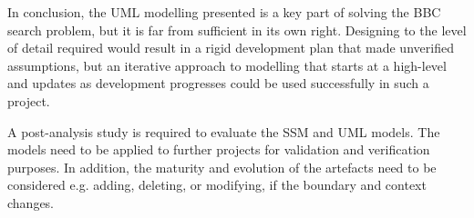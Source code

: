 \documentclass{llncs}
\begin{document}
In conclusion, the UML modelling presented is a key part of solving
the BBC search problem, but it is far from sufficient in its own right.
Designing to the level of detail required would result in a rigid
development plan that made unverified assumptions, but an iterative
approach to modelling that starts at a high-level and updates as
development progresses could be used successfully in such a project.

A post-analysis study is required to evaluate the SSM and UML models. The models
need to be applied to further projects for validation and verification purposes.
In addition, the maturity and evolution of the artefacts need to be considered
e.g. adding, deleting, or modifying, if the boundary and context changes.



\end{document}
